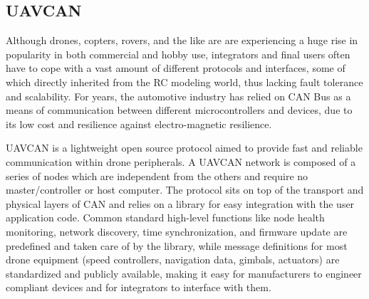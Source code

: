 \subsection{UAVCAN}

Although drones, copters, rovers, and the like are are experiencing a huge rise in popularity in both commercial and hobby use, integrators and final users often have to cope with a vast amount of different protocols and interfaces, some of which directly inherited from the RC modeling world, thus lacking fault tolerance and scalability.
For years, the automotive industry has relied on CAN Bus as a means of communication between different microcontrollers and devices, due to its low cost and resilience against electro-magnetic resilience.

UAVCAN is a lightweight open source protocol aimed to provide fast and reliable communication within drone peripherals. \cite{can}
A UAVCAN network is composed of a series of nodes which are independent from the others and require no master/controller or host computer.
The protocol sits on top of the transport and physical layers of CAN and relies on a library for easy integration with the user application code.
Common standard high-level functions like node health monitoring, network discovery, time synchronization, and firmware update are predefined and taken care of by the library, while  message definitions for most drone equipment (speed controllers, navigation data, gimbals, actuators) are standardized and publicly available, making it easy for manufacturers to engineer compliant devices and for integrators to interface with them.
